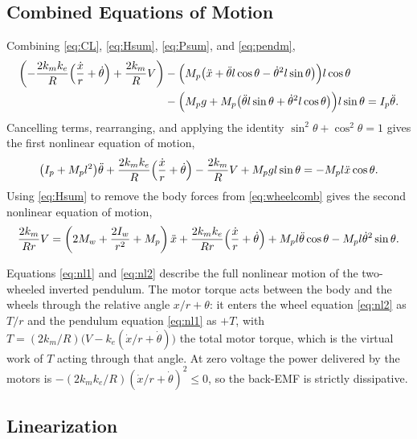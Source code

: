 \subsection{Combined Equations of Motion}

Combining \eqref{eq:CL}, \eqref{eq:Hsum}, \eqref{eq:Psum}, and \eqref{eq:pendm},
\begin{equation}\label{eq:combined}
\begin{aligned}
\left(-\frac{2k_mk_e}{R}\Bigl(\frac{\dot x}{r}+\dot\theta\Bigr)+\frac{2k_m}{R}V\right)
&-\Bigl(M_p\bigl(\ddot x+\ddot\theta l\cos\theta-\dot\theta^2l\sin\theta\bigr)\Bigr)l\cos\theta\\
&-\Bigl(M_pg+M_p\bigl(\ddot\theta l\sin\theta+\dot\theta^2l\cos\theta\bigr)\Bigr)l\sin\theta
=I_p\ddot\theta .
\end{aligned}
\end{equation}
Cancelling terms, rearranging, and applying the identity
$\sin^2\theta+\cos^2\theta=1$ gives the first nonlinear equation of motion,
\begin{equation}\label{eq:nl1}
\bigl(I_p+M_pl^2\bigr)\ddot\theta
+\frac{2k_mk_e}{R}\Bigl(\frac{\dot x}{r}+\dot\theta\Bigr)
-\frac{2k_m}{R}V
+M_pgl\sin\theta
=-M_pl\ddot x\cos\theta .
\end{equation}
Using \eqref{eq:Hsum} to remove the body forces from \eqref{eq:wheelcomb} gives
the second nonlinear equation of motion,
\begin{equation}\label{eq:nl2}
\frac{2k_m}{Rr}V=\left(2M_w+\frac{2I_w}{r^2}+M_p\right)\ddot x
+\frac{2k_mk_e}{Rr}\Bigl(\frac{\dot x}{r}+\dot\theta\Bigr)
+M_pl\ddot\theta\cos\theta
-M_pl\dot\theta^2\sin\theta .
\end{equation}

Equations \eqref{eq:nl1} and \eqref{eq:nl2} describe the full nonlinear motion
of the two-wheeled inverted pendulum. The motor torque acts between the body and
the wheels through the relative angle $x/r+\theta$: it enters the wheel equation
\eqref{eq:nl2} as $T/r$ and the pendulum equation \eqref{eq:nl1} as $+T$, with
$T=(2k_m/R)\bigl(V-k_e(\dot x/r+\dot\theta)\bigr)$ the total motor torque, which is
the virtual work of $T$ acting through that angle. At zero voltage the power
delivered by the motors is $-(2k_mk_e/R)(\dot x/r+\dot\theta)^2\le0$, so the
back-EMF is strictly dissipative.

\subsection{Linearization}

